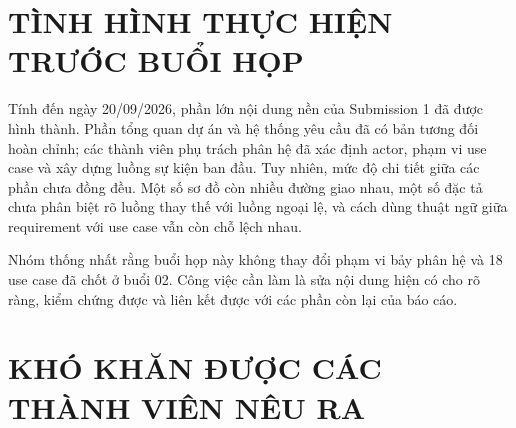 \documentclass[10pt,a4paper]{article}
\begin{document}
\section{TÌNH HÌNH THỰC HIỆN TRƯỚC BUỔI HỌP}

Tính đến ngày 20/09/2026, phần lớn nội dung nền của Submission 1 đã được hình thành. Phần tổng quan dự án và hệ thống yêu cầu đã có bản tương đối hoàn chỉnh; các thành viên phụ trách phân hệ đã xác định actor, phạm vi use case và xây dựng luồng sự kiện ban đầu. Tuy nhiên, mức độ chi tiết giữa các phần chưa đồng đều. Một số sơ đồ còn nhiều đường giao nhau, một số đặc tả chưa phân biệt rõ luồng thay thế với luồng ngoại lệ, và cách dùng thuật ngữ giữa requirement với use case vẫn còn chỗ lệch nhau.

Nhóm thống nhất rằng buổi họp này không thay đổi phạm vi bảy phân hệ và 18 use case đã chốt ở buổi 02. Công việc cần làm là sửa nội dung hiện có cho rõ ràng, kiểm chứng được và liên kết được với các phần còn lại của báo cáo.

\section{KHÓ KHĂN ĐƯỢC CÁC THÀNH VIÊN NÊU RA}
\end{document}
